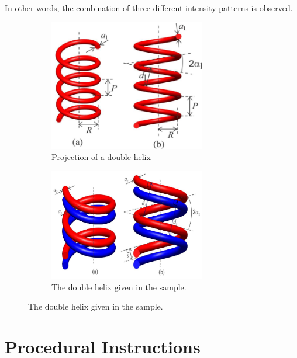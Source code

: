 In other words, the combination of three different intensity patterns is observed.

  
\begin{figure}[!htb]
    \centering
    \begin{subfigure}[b]{0.45\textwidth}
                \centering
                \includegraphics[width=0.75\textwidth]{figs/singlehelix.png}
                \caption{Projection of a double helix}
                \label{fig:doublehelixprojection}
        \end{subfigure}%
        \begin{subfigure}[b]{0.45\textwidth}
                \centering
                \includegraphics[width=0.75\textwidth]{figs/doublehelix.png}
                \caption{The double helix given in the sample.}
                \label{fig:doublehelix2}
        \end{subfigure}
\end{figure}

\section*{Procedural Instructions}

